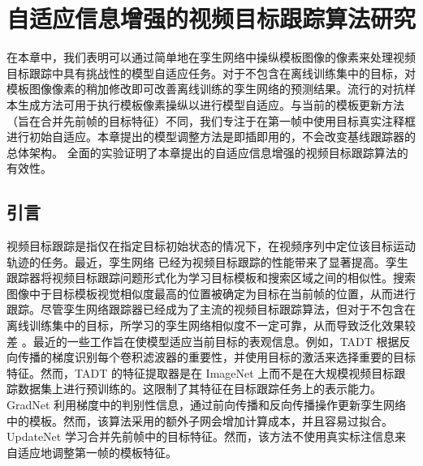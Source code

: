 \chapter{自适应信息增强的视频目标跟踪算法研究}\label{chap:MTP}
在本章中，我们表明可以通过简单地在孪生网络中操纵模板图像的像素来处理视频目标跟踪中具有挑战性的模型自适应任务。对于不包含在离线训练集中的目标，对模板图像像素的稍加修改即可改善离线训练的孪生网络的预测结果。流行的对抗样本生成方法可用于执行模板像素操纵以进行模型自适应。与当前的模板更新方法（旨在合并先前帧的目标特征）不同，我们专注于在第一帧中使用目标真实注释框进行初始自适应。本章提出的模型调整方法是即插即用的，不会改变基线跟踪器的总体架构。
全面的实验证明了本章提出的自适应信息增强的视频目标跟踪算法的有效性。

\section{引言}
视频目标跟踪是指仅在指定目标初始状态的情况下，在视频序列中定位该目标运动轨迹的任务。最近，孪生网络 \cite{danelljan2019atom, SiamFC} 已经为视频目标跟踪的性能带来了显著提高。孪生跟踪器将视频目标跟踪问题形式化为学习目标模板和搜索区域之间的相似性。搜索图像中于目标模板视觉相似度最高的位置被确定为目标在当前帧的位置，从而进行跟踪。尽管孪生网络跟踪器已经成为了主流的视频目标跟踪算法，但对于不包含在离线训练集中的目标，所学习的孪生网络相似度不一定可靠，从而导致泛化效果较差 \cite{Bhat_2019_ICCV}。最近的一些工作旨在使模型适应当前目标的表观信息。例如，TADT \cite{Li_2019_CVPR} 根据反向传播的梯度识别每个卷积滤波器的重要性，并使用目标的激活来选择重要的目标特征。然而，TADT 的特征提取器是在 ImageNet \cite{VID} 上而不是在大规模视频目标跟踪数据集上进行预训练的。这限制了其特征在目标跟踪任务上的表示能力。GradNet \cite{Li_2019_ICCV} 利用梯度中的判别性信息，通过前向传播和反向传播操作更新孪生网络中的模板。然而，该算法采用的额外子网会增加计算成本，并且容易过拟合。UpdateNet \cite{Zhang_2019_ICCV} 学习合并先前帧中的目标特征。然而，该方法不使用真实标注信息来自适应地调整第一帧的模板特征。

